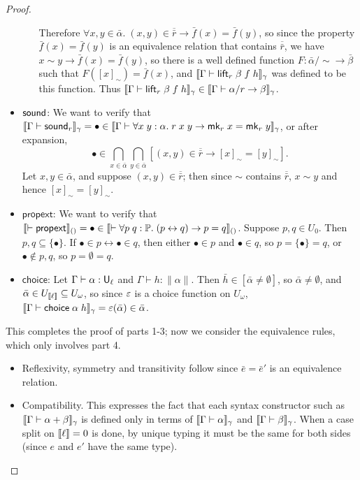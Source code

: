 \begin{proof}
\begin{itemize}
\begin{itemize}
Therefore $\forall x,y\in \bar\alpha.\;(x,y)\in\overline{\bar r}\to\bar f(x)=\bar f(y)$, so since the property $\bar f(x)=\bar f(y)$ is an equivalence relation that contains $\overline{\bar r}$, we have $x\sim y\to \bar f(x)=\bar f(y)$, so there is a well defined function $F:\bar\alpha/{\sim}\to\bar\beta$ such that $F([x]_{\sim})=\bar f(x)$, and $\scott{\Gamma\vdash\lift_r\;\beta\;f\;h}_\gamma$ was defined to be this function. Thus $\scott{\Gamma\vdash\lift_r\;\beta\;f\;h}_\gamma\in \scott{\Gamma\vdash\alpha/r\to\beta}_\gamma$.
\end{itemize}
\item $\mathsf{sound}$: We want to verify that $\scott{\Gamma\vdash\sound_r}_\gamma=\bullet\in\scott{\Gamma\vdash\forall x\;y:\alpha.\;r\;x\;y\to\mk_r\;x=\mk_r\;y}_\gamma$, or after expansion,
$$\bullet\in\bigcap_{x\in\bar\alpha}\bigcap_{y\in\bar\alpha}[(x,y)\in\overline{\bar r}\to[x]_{\sim}=[y]_{\sim}].$$
Let $x,y\in\bar\alpha$, and suppose $(x,y)\in\overline{\bar r}$; then since $\sim$ contains $\overline{\bar r}$, $x\sim y$ and hence $[x]_{\sim}=[y]_{\sim}$.
\item $\mathsf{propext}$: We want to verify that $\llbracket \vdash\mathsf{propext}\rrbracket_{()}=\bullet\in\llbracket \vdash\forall p\;q:\mathbb{P}.\;(p\leftrightarrow q)\to p=q\rrbracket_{()}$. Suppose $p,q\in U_0$. Then $p,q\subseteq\{\bullet\}$. If $\bullet\in p\leftrightarrow\bullet\in q$, then either $\bullet\in p$ and $\bullet\in q$, so $p=\{\bullet\}=q$, or $\bullet\notin p,q$, so $p=\emptyset=q$.
\item $\mathsf{choice}$: Let $\Gamma\vdash\alpha:\U_\ell$ and $\Gamma\vdash h:\|\alpha\|$. Then $\bar h\in[\bar\alpha\ne\emptyset]$, so $\bar\alpha\ne\emptyset$, and $\bar\alpha\in U_{\llbracket \ell\rrbracket}\subseteq U_\omega$, so since $\varepsilon$ is a choice function on $U_\omega$, $\scott{\Gamma\vdash\mathsf{choice}\;\alpha\;h}_\gamma=\vep(\bar\alpha)\in\bar\alpha$.
\end{itemize}
This completes the proof of parts 1-3; now we consider the equivalence rules, which only involves part 4.
\begin{itemize}
\item Reflexivity, symmetry and transitivity follow since $\bar e=\bar e'$ is an equivalence relation.
\item Compatibility. This expresses the fact that each syntax constructor such as $\scott{\Gamma\vdash \alpha+\beta}_\gamma$ is defined only in terms of $\scott{\Gamma\vdash \alpha}_\gamma$ and $\scott{\Gamma\vdash\beta}_\gamma$. When a case split on $\llbracket \ell\rrbracket=0$ is done, by unique typing it must be the same for both sides (since $e$ and $e'$ have the same type).

\end{itemize}
\end{proof}
